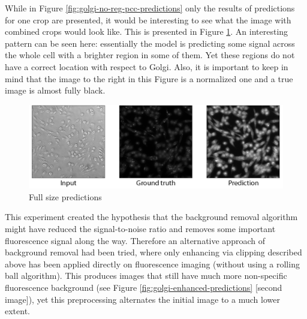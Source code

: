 While in Figure \ref{fig:golgi-no-reg-pcc-predictions} only the results of predictions for one crop are presented, it would be interesting to see what the image with combined crops would look like. This is presented in Figure \ref{fig:golgi-no-reg-pcc-predictions-full}. An interesting pattern can be seen here: essentially the model is predicting some signal across the whole cell with a brighter region in some of them. Yet these regions do not have a correct location with respect to Golgi. Also, it is important to keep in mind that the image to the right in this Figure is a normalized one and a true image is almost fully black. 
\begin{figure}[htb]
	\begin{center}
		\includegraphics[width=0.8\linewidth]{bilder/golgi/full-img.png}
		\caption{Full size predictions}\label{fig:golgi-no-reg-pcc-predictions-full}
	\end{center}
\end{figure}

This experiment created the hypothesis that the background removal algorithm might have reduced the signal-to-noise ratio and removes some important fluorescence signal along the way. Therefore an alternative approach of background removal had been tried, where only enhancing via clipping described above has been applied directly on fluorescence imaging (without using a rolling ball algorithm). This produces images that still have much more non-specific fluorescence background (see Figure \ref{fig:golgi-enhanced-predictions} [second image]), yet this preprocessing alternates the initial image to a much lower extent. 

